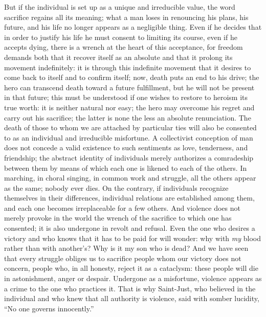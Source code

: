 \documentclass[11pt]{article}
\begin{document}
{{But if the individual is set up as a unique and irreducible value, the word sacrifice regains all its meaning; what a man loses in renouncing his plans, his future, and his life no longer appears as a negligible thing. Even if he decides that in order to justify his life he must consent to limiting its course, even if he accepts dying, there is a wrench at the heart of this acceptance, for freedom demands both that it recover itself as an absolute and that it prolong its movement indefinitely: it is through this indefinite movement that it desires to come back to itself and to confirm itself; now, death puts an end to his drive; the hero can transcend death toward a future fulfillment, but he will not be present in that future; this must be understood if one wishes to restore to heroism its true worth: it is neither natural nor easy; the hero may overcome his regret and carry out his sacrifice; the latter is none the less an absolute renunciation. The death of those to whom we are attached by particular ties will also be consented to as an individual and irreducible misfortune. A collectivist conception of man does not concede a valid existence to such sentiments as love, tenderness, and friendship; the abstract identity of individuals merely authorizes a comradeship between them by means of which each one is likened to each of the others. In marching, in choral singing, in common work and struggle, all the others appear as the same; nobody ever dies. On the contrary, if individuals recognize themselves in their differences, individual relations are established among them, and each one becomes irreplaceable for a few others. And violence does not merely provoke in the world the wrench of the sacrifice to which one has consented; it is also undergone in revolt and refusal. Even the one who desires a victory and who knows that it has to be paid for will wonder: why with \textit{my} blood rather than with another’s? Why is it my son who is dead? And we have seen that every struggle obliges us to sacrifice people whom our victory does not concern, people who, in all honesty, reject it as a cataclysm: these people will die in astonishment, anger or despair. Undergone as a misfortune, violence appears as a crime to the one who practices it. That is why Saint-Just, who believed in the individual and who knew that all authority is violence, said with somber lucidity, “No one governs innocently.”

}}
\end{document}
